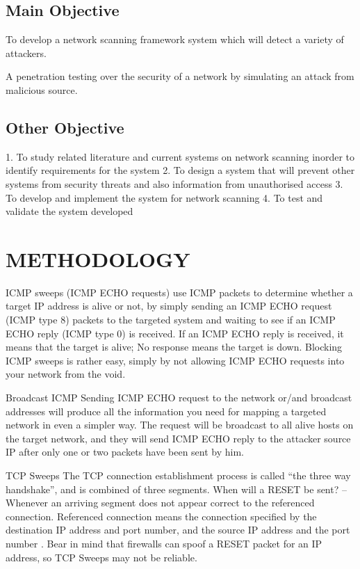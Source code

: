 \documentclass{article}
\begin{document}
\subsection{Main Objective}\label{sec:into}
To   develop a network scanning framework system which will detect a variety of attackers.


A penetration testing over the  security  of a network by simulating an attack from malicious source.


\subsection{Other Objective}\label{sec:into}
 1. To study related literature and current systems on network scanning inorder to identify requirements for the system
 2. To design a system that will prevent other systems from security threats and also information from unauthorised access
 3. To develop and implement the system for network scanning
 4. To test and validate the system developed

\section{METHODOLOGY}\label{sec:into}

ICMP sweeps (ICMP ECHO requests)
use ICMP packets to determine whether a target IP address is alive or not, by simply
sending an ICMP ECHO request (ICMP type 8) packets to the targeted system and waiting to
see if an ICMP ECHO reply (ICMP type 0) is received. If an ICMP ECHO reply is received, it
means that the target is alive; No response means the target is down.
Blocking ICMP sweeps is rather easy, simply by not allowing ICMP ECHO requests into your
network from the void.


Broadcast ICMP
Sending ICMP ECHO request to the network or/and broadcast addresses will produce all the
information you need for mapping a targeted network in even a simpler way.
The request will be broadcast to all alive hosts on the target network, and they will send ICMP
ECHO reply to the attacker source IP after only one or two packets have been sent by him.


TCP Sweeps
The TCP connection establishment process is called “the three way handshake”, and is
combined of three segments.
When will a RESET be sent? – Whenever an arriving segment does not appear correct to the
referenced connection. Referenced connection means the connection specified by the
destination IP address and port number, and the source IP address and the port number .
Bear in mind that firewalls can spoof a RESET packet for an IP address, so TCP Sweeps may
not be reliable.
\end{document}
